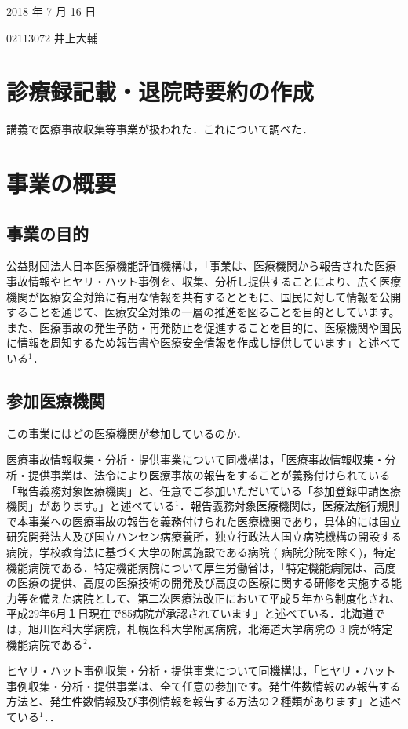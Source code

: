 \documentclass[11pt,dvipdfmx,uplatex]{jsarticle}
\begin{document}
2018 年 7 月 16 日

02113072 井上大輔
\section*{診療録記載・退院時要約の作成}

講義で医療事故収集等事業が扱われた．これについて調べた．

\section{事業の概要}

\subsection{事業の目的}

公益財団法人日本医療機能評価機構は，「事業は、医療機関から報告された医療事故情報やヒヤリ・ハット事例を、収集、分析し提供することにより、広く医療機関が医療安全対策に有用な情報を共有するとともに、国民に対して情報を公開することを通じて、医療安全対策の一層の推進を図ることを目的としています。また、医療事故の発生予防・再発防止を促進することを目的に、医療機関や国民に情報を周知するため報告書や医療安全情報を作成し提供しています」と述べている$^1$．

\subsection{参加医療機関}

この事業にはどの医療機関が参加しているのか．

医療事故情報収集・分析・提供事業について同機構は，「医療事故情報収集・分析・提供事業は、法令により医療事故の報告をすることが義務付けられている「報告義務対象医療機関」と、任意でご参加いただいている「参加登録申請医療機関」があります。」と述べている$^1$．報告義務対象医療機関は，医療法施行規則で本事業への医療事故の報告を義務付けられた医療機関であり，具体的には国立研究開発法人及び国立ハンセン病療養所，独立行政法人国立病院機構の開設する病院，学校教育法に基づく大学の附属施設である病院 ( 病院分院を除く)，特定機能病院である．特定機能病院について厚生労働省は，「特定機能病院は、高度の医療の提供、高度の医療技術の開発及び高度の医療に関する研修を実施する能力等を備えた病院として、第二次医療法改正において平成５年から制度化され、平成29年6月１日現在で85病院が承認されています」と述べている．北海道では，旭川医科大学病院，札幌医科大学附属病院，北海道大学病院の 3 院が特定機能病院である$^2$．

ヒヤリ・ハット事例収集・分析・提供事業について同機構は，「ヒヤリ・ハット事例収集・分析・提供事業は、全て任意の参加です。発生件数情報のみ報告する方法と、発生件数情報及び事例情報を報告する方法の２種類があります」と述べている$^1$．．
\end{document}

